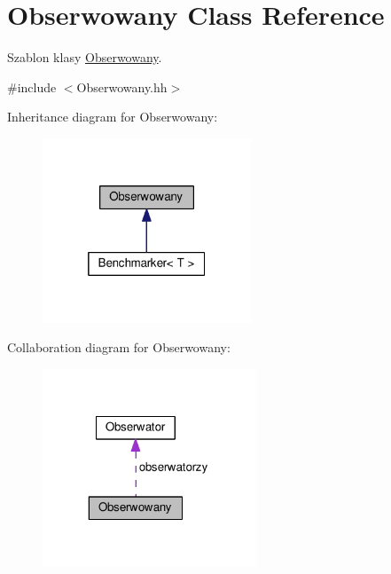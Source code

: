 \hypertarget{a00015}{}\section{Obserwowany Class Reference}
\label{a00015}


Szablon klasy \hyperlink{a00015}{Obserwowany}.  




{\ttfamily \#include $<$Obserwowany.\+hh$>$}



Inheritance diagram for Obserwowany\+:
\nopagebreak
\begin{figure}[H]
\begin{center}
\leavevmode
\includegraphics[width=176pt]{a00142}
\end{center}
\end{figure}


Collaboration diagram for Obserwowany\+:
\nopagebreak
\begin{figure}[H]
\begin{center}
\leavevmode
\includegraphics[width=181pt]{a00143}
\end{center}
\end{figure}
